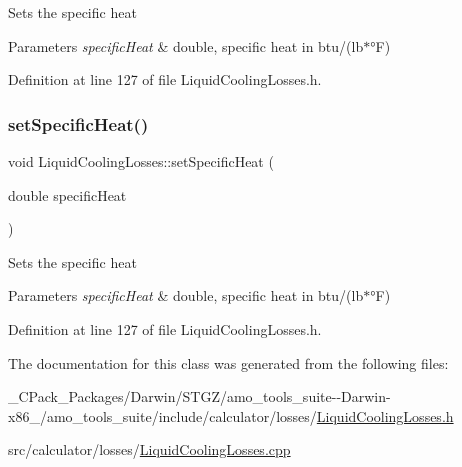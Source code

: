 Sets the specific heat 
\begin{DoxyParams}{Parameters}
{\em specific\+Heat} & double, specific heat in btu/(lb$\ast$°F) \\
\hline
\end{DoxyParams}


Definition at line 127 of file Liquid\+Cooling\+Losses.\+h.

\mbox{\label{class_liquid_cooling_losses_a38ff1ff4dc0de69c72db094bf2259993}} 
\subsubsection{\texorpdfstring{set\+Specific\+Heat()}{setSpecificHeat()}\hspace{0.1cm}{\footnotesize\ttfamily [3/3]}}
{\footnotesize\ttfamily void Liquid\+Cooling\+Losses\+::set\+Specific\+Heat (\begin{DoxyParamCaption}\item[{double}]{specific\+Heat }\end{DoxyParamCaption})\hspace{0.3cm}{\ttfamily [inline]}}

Sets the specific heat 
\begin{DoxyParams}{Parameters}
{\em specific\+Heat} & double, specific heat in btu/(lb$\ast$°F) \\
\hline
\end{DoxyParams}


Definition at line 127 of file Liquid\+Cooling\+Losses.\+h.



The documentation for this class was generated from the following files\+:\begin{DoxyCompactItemize}
\item 
\+\_\+\+C\+Pack\+\_\+\+Packages/\+Darwin/\+S\+T\+G\+Z/amo\+\_\+tools\+\_\+suite-\/-\/\+Darwin-\/x86\+\_/amo\+\_\+tools\+\_\+suite/include/calculator/losses/\hyperlink{___c_pack___packages_2_darwin_2_s_t_g_z_2amo__tools__suite--_darwin-x86__64_2amo__tools__suite_2cdd1b9218cec46d428c4e8ed55a2f82a}{Liquid\+Cooling\+Losses.\+h}\item 
src/calculator/losses/\hyperlink{_liquid_cooling_losses_8cpp}{Liquid\+Cooling\+Losses.\+cpp}\end{DoxyCompactItemize}
